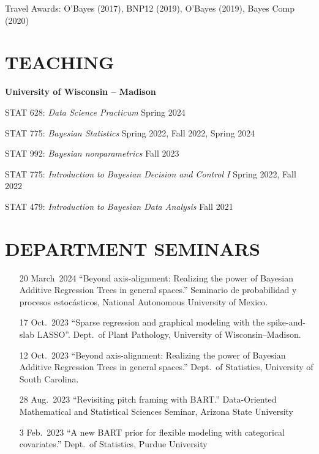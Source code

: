 \documentclass[margin]{res}
\begin{document}
\begin{resume}
Travel Awards: O'Bayes (2017), BNP12 (2019), O'Bayes (2019), Bayes Comp (2020)

\section{TEACHING}

\textbf{University of Wisconsin -- Madison} 

STAT 628: {\it Data Science Practicum} \hfill Spring 2024

STAT 775: {\it Bayesian Statistics} \hfill Spring 2022, Fall 2022, Spring 2024

STAT 992: {\it Bayesian nonparametrics} \hfill Fall 2023

STAT 775: {\it Introduction to Bayesian Decision and Control I} \hfill Spring 2022, Fall 2022

STAT 479: {\it Introduction to Bayesian Data Analysis} \hfill Fall 2021


\section{DEPARTMENT SEMINARS}

\vspace{0.5in}
\begin{itemize}

\item[20 March~2024]{``Beyond axis-alignment: Realizing the power of Bayesian Additive Regression Trees in general spaces.'' Seminario de probabilidad y procesos estoc\'{a}sticos, National Autonomous University of Mexico.}

\item[17 Oct.~2023]{``Sparse regression and graphical modeling with the spike-and-slab LASSO''. Dept.~of Plant Pathology, University of Wisconsin--Madison.}

\item[12 Oct.~2023]{``Beyond axis-alignment: Realizing the power of Bayesian Additive Regression Trees in general spaces.'' Dept.~of Statistics, University of South Carolina.}

\item[28 Aug.~2023]{``Revisiting pitch framing with BART.'' Data-Oriented Mathematical and Statistical Sciences Seminar, Arizona State University}

\item[3 Feb.~2023]{``A new BART prior for flexible modeling with categorical covariates.'' Dept.~of Statistics, Purdue University}


\end{itemize}
\end{resume}
\end{document}
